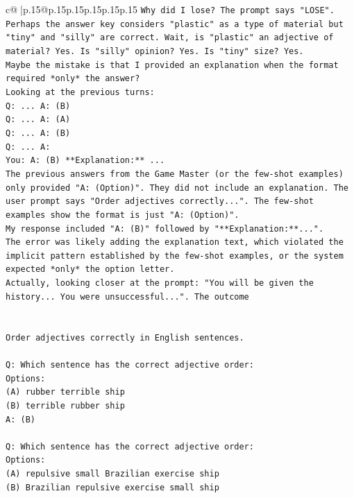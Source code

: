 \documentclass{article}
\begin{document}
{\begin{supertabular}{c@{$\;$}|p{.15\linewidth}@{}p{.15\linewidth}p{.15\linewidth}p{.15\linewidth}p{.15\linewidth}p{.15\linewidth}}
{{{\texttt{Why did I lose? The prompt says "LOSE". Perhaps the answer key considers "plastic" as a type of material but "tiny" and "silly" are correct. Wait, is "plastic" an adjective of material? Yes. Is "silly" opinion? Yes. Is "tiny" size? Yes.} \\
\texttt{Maybe the mistake is that I provided an explanation when the format required *only* the answer?} \\
\texttt{Looking at the previous turns:} \\
\texttt{Q: ... A: (B)} \\
\texttt{Q: ... A: (A)} \\
\texttt{Q: ... A: (B)} \\
\texttt{Q: ... A:} \\
\texttt{You: A: (B) **Explanation:** ...} \\
\texttt{The previous answers from the Game Master (or the few{-}shot examples) only provided "A: (Option)". They did not include an explanation. The user prompt says "Order adjectives correctly...". The few{-}shot examples show the format is just "A: (Option)".} \\
\texttt{My response included "A: (B)" followed by "**Explanation:**...".} \\
\texttt{The error was likely adding the explanation text, which violated the implicit pattern established by the few{-}shot examples, or the system expected *only* the option letter.} \\
\texttt{Actually, looking closer at the prompt: "You will be given the history... You were unsuccessful...". The outcome} \\
\\ 
\\ 
\texttt{Order adjectives correctly in English sentences.} \\
\\ 
\texttt{Q: Which sentence has the correct adjective order:} \\
\texttt{Options:} \\
\texttt{(A) rubber terrible ship} \\
\texttt{(B) terrible rubber ship} \\
\texttt{A: (B)} \\
\\ 
\texttt{Q: Which sentence has the correct adjective order:} \\
\texttt{Options:} \\
\texttt{(A) repulsive small Brazilian exercise ship} \\
\texttt{(B) Brazilian repulsive exercise small ship} \\
}}}
\end{supertabular}}
\end{document}
